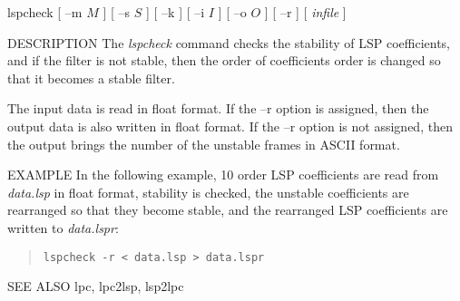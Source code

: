 
\begin{synopsis}
\item [lspcheck] [ --m $M$ ] [ --s $S$ ] [ --k ] [ --i $I$ ] [ --o $O$ ]
		[ --r ] [ {\em infile} ] 
\end{synopsis}

\begin{qsection}{DESCRIPTION}
The {\em lspcheck} command checks the stability of LSP coefficients,
and if the filter is not stable,
then the order of coefficients order is changed so that
it becomes a stable filter.
\par
The input data is read in float format.
If the --r option is assigned, then the output data is also
written in float format.
If the --r option is not assigned, then the output brings
the number of the unstable frames in ASCII format.
\end{qsection}

\begin{options}
\end{options}

\begin{qsection}{EXAMPLE}
In the following example, 10 order LSP coefficients are
read from {\em data.lsp} in float format,
stability is checked, the unstable coefficients are rearranged
so that they become stable, and the rearranged LSP coefficients
are written to {\em data.lspr}:
\begin{quote}
\verb!lspcheck -r < data.lsp > data.lspr!
\end{quote}
\end{qsection}

\begin{qsection}{SEE ALSO}
 lpc, lpc2lsp, lsp2lpc
\end{qsection}

